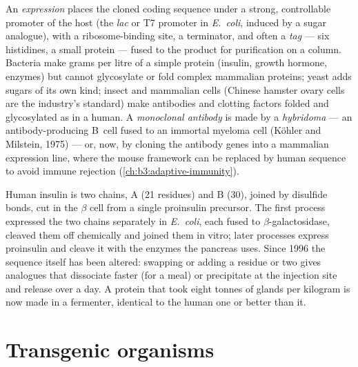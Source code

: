 \begin{definition}\label{def:b3:genetic-engineering:expression}
An \emph{expression } places the cloned coding sequence under a
strong, controllable promoter of the host (the \emph{lac} or T7
promoter in \emph{E.~coli}, induced by a sugar analogue), with a
ribosome-binding site, a terminator, and often a \emph{tag} --- six
histidines, a small protein --- fused to the product for purification
on a column. Bacteria make grams per litre of a simple protein
(insulin, growth hormone, enzymes) but cannot glycosylate or fold
complex mammalian proteins; yeast adds sugars of its own kind; insect
and mammalian cells (Chinese hamster ovary cells are the industry's
standard) make antibodies and clotting factors folded and glycosylated
as in a human. A \emph{monoclonal antibody} is made by a
\emph{hybridoma} --- an antibody-producing B~cell fused to an immortal
myeloma cell (Köhler and Milstein, 1975) --- or, now, by cloning the
antibody genes into a mammalian expression line, where the mouse
framework can be replaced by human sequence to avoid immune rejection
(\cref{ch:b3:adaptive-immunity}).
\end{definition}

\begin{example}[Insulin]\label{ex:b3:genetic-engineering:insulin}
Human insulin is two chains, A (21 residues) and B (30), joined by
disulfide bonds, cut in the $\beta$ cell from a single proinsulin
precursor. The first process expressed the two chains separately in
\emph{E.~coli}, each fused to $\beta$-galactosidase, cleaved them off
chemically and joined them in vitro; later processes express proinsulin
and cleave it with the enzymes the pancreas uses. Since 1996 the
sequence itself has been altered: swapping or adding a residue or two
gives analogues that dissociate faster (for a meal) or precipitate at
the injection site and release over a day. A protein that took eight
tonnes of glands per kilogram is now made in a fermenter, identical to
the human one or better than it.
\end{example}

\section{Transgenic organisms}

